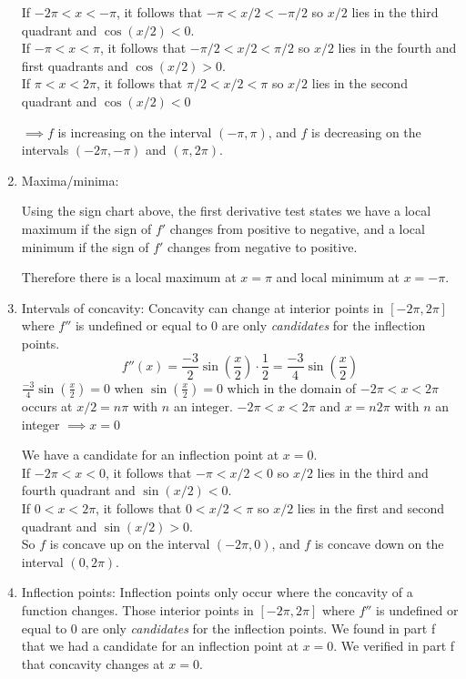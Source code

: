 \documentclass[nooutcomes]{ximera}
\begin{document}
\begin{problem}
\begin{freeResponse}
\begin{enumerate}
        If $-2\pi <x< -\pi$, it follows that $-\pi<x/2<-\pi /2$ so $x/2$ lies in the third quadrant and $\cos(x/2)<0$. \\
         If $-\pi <x< \pi$, it follows that $-\pi /2<x/2<\pi /2$ so $x/2$ lies in the fourth and first quadrants and $\cos(x/2)>0$.  \\
         If $\pi <x< 2\pi$, it follows that $\pi /2<x/2<\pi$ so $x/2$ lies in the second quadrant and $\cos(x/2)<0$


         $\implies f$ is increasing on the interval $(-\pi, \pi)$, and $f$ is
        decreasing on the intervals $(-2\pi, -\pi)$ and $(\pi, 2\pi)$.
     
\item Maxima/minima:
 
       Using the sign chart above, the first derivative test states
        we have a local maximum if the sign of $f'$ changes from
        positive to negative, and a local minimum if the sign of $f'$
        changes from negative to positive.

        Therefore there is a local maximum at $x = \pi$ and local
        minimum at $x = -\pi$.
        
        
     \item Intervals of concavity:
      Concavity can change at  interior points in $[-2\pi, 2\pi]$
            where $f''$ is undefined or equal to 0 are only
            \emph{candidates} for the inflection points.  
             \[
          f''(x) = \frac{-3}{2} \sin\left(\frac{x}{2}\right) \cdot
          \frac{1}{2} = \frac{-3}{4} \sin\left(\frac{x}{2}\right)
        \]
$\frac{-3}{4} \sin\left(\frac{x}{2}\right)=0$ when $\sin\left(\frac{x}{2}\right)=0$ which in the domain of $-2\pi < x < 2\pi$ occurs at $x/2 = n\pi$ with $n$ an integer.
$-2\pi < x < 2\pi$ and $x =  n2\pi$   with $n$ an integer $\implies x = 0$

We have a candidate for an inflection point at $x=0$. \\
 If $-2\pi <x< 0$, it follows that $-\pi<x/2<0$ so $x/2$ lies in the third and fourth quadrant and $\sin(x/2)<0$. \\
  If $0 <x<2 \pi$, it follows that $0<x/2<\pi$ so $x/2$ lies in the first and second quadrant and $\sin(x/2)>0$. \\


            So $f$ is concave up on the interval $(-2\pi, 0)$, and $f$
            is concave down on the interval $(0, 2\pi)$.   
    \item Inflection points: 
             Inflection points only occur where the concavity of a
            function changes. Those interior points in $[-2\pi, 2\pi]$
            where $f''$ is undefined or equal to 0 are only
            \emph{candidates} for the inflection points.  We found in part f that we had a candidate for an inflection point at $x=0$.  We verified in part f that concavity changes at $x=0$.
            



\end{enumerate}
\end{freeResponse}
\end{problem}
\end{document}
